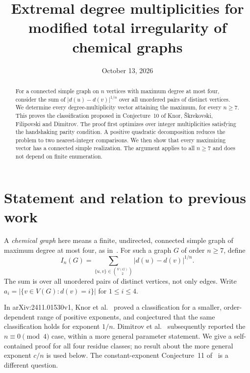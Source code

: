 \documentclass[11pt]{article}
\title{Extremal degree multiplicities for modified total\newline
irregularity of chemical graphs}
\author{}
\date{October 13, 2026}
\begin{document}
\maketitle

\begin{abstract}
For a connected simple graph on $n$ vertices with maximum degree at most
four, consider the sum of $|d(u)-d(v)|^{1/n}$ over all unordered pairs of
distinct vertices. We determine every degree-multiplicity vector attaining
the maximum, for every $n\geq7$. This proves the classification proposed in
Conjecture~10 of Knor, \v Skrekovski, Filipovski and Dimitrov. The proof first
optimizes over integer multiplicities satisfying the handshaking parity
condition. A positive quadratic decomposition reduces the problem to two
nearest-integer comparisons. We then show that every maximizing vector has
a connected simple realization. The argument applies to all $n\geq7$ and
does not depend on finite enumeration.
\end{abstract}

\section{Statement and relation to previous work}

A \emph{chemical graph} here means a finite, undirected, connected simple
graph of maximum degree at most four, as in~\cite{knor}. For such a graph
$G$ of order $n\geq7$, define
\begin{equation}\label{eq:index}
 I_n(G)=\sum_{\{u,v\}\in\binom{V(G)}{2}}|d(u)-d(v)|^{1/n}.
\end{equation}
The sum is over all unordered pairs of distinct vertices, not only edges.
Write $a_i=|\{v\in V(G):d(v)=i\}|$ for $1\leq i\leq4$.

In arXiv:2411.01530v1, Knor et al.~\cite[Theorem~9 and Conjecture~10]{knor}
proved a classification
for a smaller, order-dependent range of positive exponents, and conjectured
that the same classification holds for exponent $1/n$.
Dimitrov et al.~\cite[Theorem~2.2]{dimitrov} subsequently reported the
$n\equiv0\pmod4$ case, within a more general parameter statement.
We give a self-contained proof for all four residue classes; no result
about the more general exponent $c/n$ is used below.
The constant-exponent Conjecture~11 of~\cite{knor} is a different question.
\end{document}
